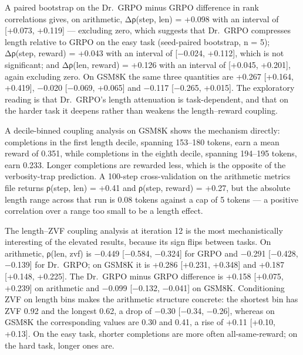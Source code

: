 \documentclass[12pt,a4paper]{report}
\begin{document}
A paired bootstrap on the Dr.~GRPO minus GRPO difference in rank
correlations gives, on arithmetic, Δρ(step, len) = +0.098 with an
interval of {[}+0.073, +0.119{]} --- excluding zero, which suggests that
Dr.~GRPO compresses length relative to GRPO on the easy task
(seed-paired bootstrap, n = 5); Δρ(step, reward) = +0.043 with an
interval of {[}−0.024, +0.112{]}, which is not significant; and Δρ(len,
reward) = +0.126 with an interval of {[}+0.045, +0.201{]}, again
excluding zero. On GSM8K the same three quantities are +0.267 {[}+0.164,
+0.419{]}, −0.020 {[}−0.069, +0.065{]} and −0.117 {[}−0.265, +0.015{]}.
The exploratory reading is that Dr.~GRPO's length attenuation is
task-dependent, and that on the harder task it deepens rather than
weakens the length--reward coupling.

A decile-binned coupling analysis on GSM8K shows the mechanism directly:
completions in the first length decile, spanning 153--180 tokens, earn a
mean reward of 0.351, while completions in the eighth decile, spanning
194--195 tokens, earn 0.233. Longer completions are rewarded less, which
is the opposite of the verbosity-trap prediction. A 100-step
cross-validation on the arithmetic metrics file returns ρ(step, len) =
+0.41 and ρ(step, reward) = +0.27, but the absolute length range across
that run is 0.08 tokens against a cap of 5 tokens --- a positive
correlation over a range too small to be a length effect.

The length--ZVF coupling analysis at iteration 12 is the most
mechanistically interesting of the elevated results, because its sign
flips between tasks. On arithmetic, ρ(len, zvf) is −0.449 {[}−0.584,
−0.324{]} for GRPO and −0.291 {[}−0.428, −0.139{]} for Dr.~GRPO; on
GSM8K it is +0.286 {[}+0.231, +0.348{]} and +0.187 {[}+0.148, +0.225{]}.
The Dr.~GRPO minus GRPO difference is +0.158 {[}+0.075, +0.239{]} on
arithmetic and −0.099 {[}−0.132, −0.041{]} on GSM8K. Conditioning ZVF on
length bins makes the arithmetic structure concrete: the shortest bin
has ZVF 0.92 and the longest 0.62, a drop of −0.30 {[}−0.34, −0.26{]},
whereas on GSM8K the corresponding values are 0.30 and 0.41, a rise of
+0.11 {[}+0.10, +0.13{]}. On the easy task, shorter completions are more
often all-same-reward; on the hard task, longer ones are.
\end{document}
